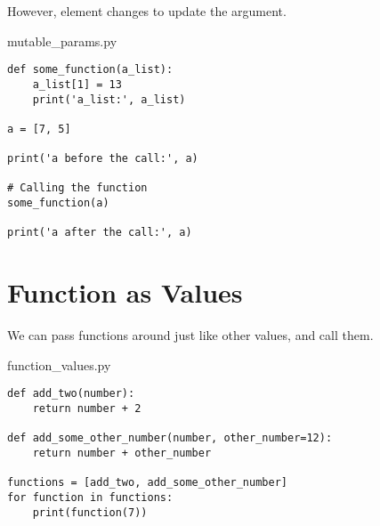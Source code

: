 \documentclass[aspectratio=1610,slidestop]{beamer}
\begin{document}
\begin{pframe}
 However, element changes to update the argument.
 \medskip

 \begin{minipage}[t]{0.50\textwidth}
  \begin{pythonfile}{mutable\_params.py}
   \begin{verbatim}
def some_function(a_list):
    a_list[1] = 13
    print('a_list:', a_list)

a = [7, 5]

print('a before the call:', a)

# Calling the function
some_function(a)

print('a after the call:', a)
   \end{verbatim}
  \end{pythonfile}
 \end{minipage}\qquad
 \pause
 \begin{minipage}[t]{0.45\textwidth}
 \vspace{-5.65cm}
 \begin{terminal}
  \end{terminal}
 \end{minipage}
\end{pframe}



\section{Function as Values}

\begin{pframe}
\vspace{-0.5cm}
 We can pass functions around just like other values, and call them.
 \begin{pythonfile}{function\_values.py}
  \begin{verbatim}
def add_two(number):
    return number + 2

def add_some_other_number(number, other_number=12):
    return number + other_number

functions = [add_two, add_some_other_number]
for function in functions:
    print(function(7))
  \end{verbatim}
 \end{pythonfile}
 \pause
 \begin{terminal}
 \end{terminal}
\end{pframe}
\end{document}
